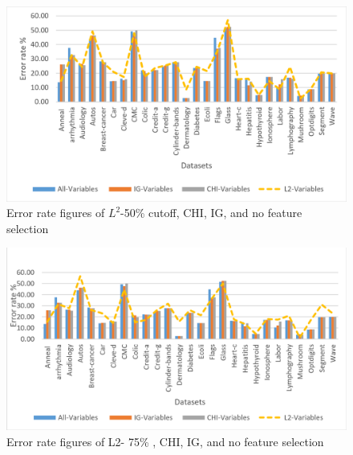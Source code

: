 \documentclass[review]{elsarticle}
\begin{document}
\begin{figure}[h]
	\centering
	\includegraphics[width=0.8\linewidth]{figs/fig_4_error_rt_50.png}
	\caption[fig-4-error-rt-50]{Error rate figures of $ L^2 $-50\% cutoff, CHI, IG, and no feature selection }
	\label{fig:fig-4-error-rt-50}
\end{figure}



\begin{figure}[h]
	\centering
	\includegraphics[width=0.8\linewidth]{figs/fig_5_error_rt_75.png}
	\caption[fig-5-error-rt-75]{Error rate figures of L2- 75\% , CHI, IG, and no feature selection  }
	\label{fig:fig_5_error_rt_75}
\end{figure}
\end{document}
